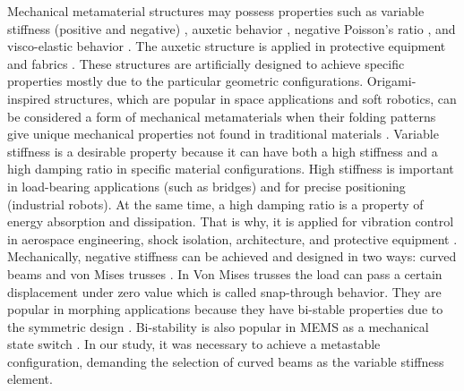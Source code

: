 \documentclass[lettersize,journal]{IEEEtran}
\begin{document}
Mechanical metamaterial structures may possess properties such as variable stiffness (positive and negative) \cite{wang2004extreme}, auxetic behavior \cite{barchiesi2019mechanical}, negative Poisson's ratio \cite{guo20213d}, and visco-elastic behavior \cite{correa2015negative}. The auxetic structure is applied in protective equipment and fabrics \cite{nguyen2023auxetic}. These structures are artificially designed to achieve specific properties mostly due to the particular geometric configurations. Origami-inspired structures, which are popular in space applications and soft robotics, can be considered a form of mechanical metamaterials when their folding patterns give unique mechanical properties not found in traditional materials \cite{filipov2015origami}. Variable stiffness is a desirable property because it can have both a high stiffness and a high damping ratio in specific material configurations. High stiffness is important in load-bearing applications (such as bridges) and for precise positioning (industrial robots). At the same time, a high damping ratio is a property of energy absorption and dissipation. That is why, it is applied for vibration control in aerospace engineering, shock isolation, architecture, and protective equipment \cite{saeed2023review, ding2020designs,chen2019seismic,chen2022quasi,mezghani2022effectiveness}. Mechanically, negative stiffness can be achieved and designed in two ways: curved beams and von Mises trusses \cite{barchiesi2019mechanical}. In Von Mises trusses the load can pass a certain displacement under zero value which is called snap-through behavior. They are popular in morphing applications because they have bi-stable properties due to the symmetric design \cite{barbarino2013bi}. Bi-stability is also popular in MEMS as a mechanical state switch \cite{du2018harmonically, meng2021bistability, mei2021mechanical}. In our study, it was necessary to achieve a metastable configuration, demanding the selection of curved beams as the variable stiffness element.
\end{document}
